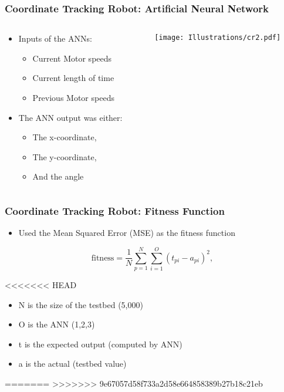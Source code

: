 \documentclass{beamer}
\begin{document}
\begin{frame}
\begin{frame}
  \frametitle{Coordinate Tracking Robot: Artificial Neural Network}
  \begin{columns}
  \begin{column}{0.5\textwidth}
\begin{itemize}
\item Inputs of the ANNs:
\begin{itemize}
\item Current Motor speeds
\item Current length of time
\item Previous Motor speeds
\end{itemize}
\item The ANN output was either:
\begin{itemize}
\item The x-coordinate,
\item The y-coordinate,
\item And the angle
\end{itemize}
\end{itemize}
\end{column}
\begin{column}{0.5\textwidth}
 \texttt{[image: Illustrations/cr2.pdf]}
       \\
\end{column}
\end{columns}
\end{frame}

\begin{frame}[fragile]
\frametitle{Coordinate Tracking Robot: Fitness Function}
\begin{itemize}
\item Used the Mean Squared Error (MSE) as the fitness function
\end{itemize}
  \[
  \textrm{fitness} = \frac{1}{N}\sum\limits_{p=1}^N\sum\limits_{i=1}^O (t_{pi} - a_{pi})^2,
\] 

<<<<<<< HEAD
\begin{itemize}
\item N is the size of the testbed (5,000) %
\item O is the ANN (1,2,3)
\item t is the expected output (computed by ANN)
\item a is the actual (testbed value)
\end{itemize}
=======
>>>>>>> 9e67057d58f733a2d58e664858389b27b18c21eb
\end{frame}


\end{frame}
\end{document}
